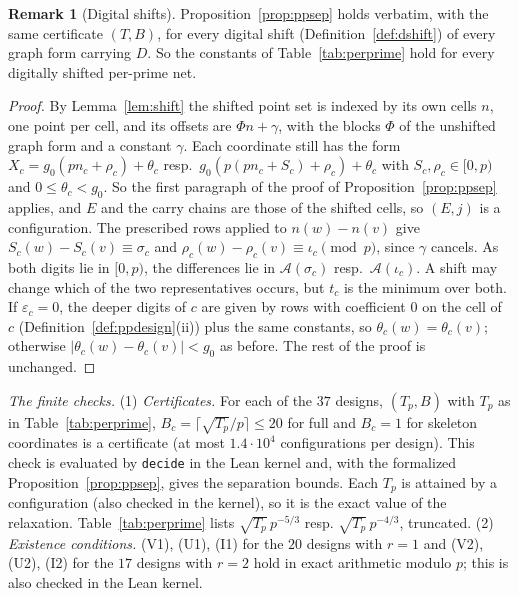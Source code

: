 \documentclass[11pt]{amsart}
\theoremstyle{definition}
\newtheorem{remark}[theorem]{Remark}
\theoremstyle{plain}
\begin{document}
\begin{remark}[Digital shifts]\label{rem:ppshift}
Proposition~\ref{prop:ppsep} holds verbatim, with the same certificate $(T,B)$, for every digital shift (Definition~\ref{def:dshift}) of every graph form carrying $D$. So the constants of Table~\ref{tab:perprime} hold for every digitally shifted per-prime net.
\end{remark}

\begin{proof}
By Lemma~\ref{lem:shift} the shifted point set is indexed by its own cells $n$, one point per cell, and its offsets are $\Phi n+\gamma$, with the blocks $\Phi$ of the unshifted graph form and a constant $\gamma$. Each coordinate still has the form $X_c=g_0(pn_c+\rho_c)+\theta_c$ resp.\ $g_0(p(pn_c+S_c)+\rho_c)+\theta_c$ with $S_c,\rho_c\in[0,p)$ and $0\le\theta_c<g_0$. So the first paragraph of the proof of Proposition~\ref{prop:ppsep} applies, and $E$ and the carry chains are those of the shifted cells, so $(E,j)$ is a configuration. The prescribed rows applied to $n(w)-n(v)$ give $S_c(w)-S_c(v)\equiv\sigma_c$ and $\rho_c(w)-\rho_c(v)\equiv\iota_c\pmod p$, since $\gamma$ cancels. As both digits lie in $[0,p)$, the differences lie in $\mathcal A(\sigma_c)$ resp.\ $\mathcal A(\iota_c)$. A shift may change which of the two representatives occurs, but $t_c$ is the minimum over both. If $\varepsilon_c=0$, the deeper digits of $c$ are given by rows with coefficient $0$ on the cell of $c$ (Definition~\ref{def:ppdesign}(ii)) plus the same constants, so $\theta_c(w)=\theta_c(v)$; otherwise $|\theta_c(w)-\theta_c(v)|<g_0$ as before. The rest of the proof is unchanged.
\end{proof}


\emph{The finite checks.} (1) \emph{Certificates.} For each of the $37$ designs, $(T_p,B)$ with $T_p$ as in Table~\ref{tab:perprime}, $B_c=\lceil\sqrt{T_p}/p\rceil\le20$ for full and $B_c=1$ for skeleton coordinates is a certificate (at most $1.4\cdot10^4$ configurations per design). This check is evaluated by \texttt{decide} in the Lean kernel and, with the formalized Proposition~\ref{prop:ppsep}, gives the separation bounds. Each $T_p$ is attained by a configuration (also checked in the kernel), so it is the exact value of the relaxation. Table~\ref{tab:perprime} lists $\sqrt{T_p}\,p^{-5/3}$ resp. $\sqrt{T_p}\,p^{-4/3}$, truncated. (2) \emph{Existence conditions.} (V1), (U1), (I1) for the $20$ designs with $r=1$ and (V2), (U2), (I2) for the $17$ designs with $r=2$ hold in exact arithmetic modulo $p$; this is also checked in the Lean kernel.
\end{document}
